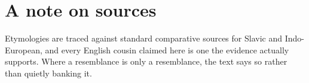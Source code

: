 
\backmatter





\chapter*{A note on sources}

Etymologies are traced against standard comparative sources for Slavic and
Indo-European, and every English cousin claimed here is one the evidence
actually supports. Where a resemblance is only a resemblance, the text says so
rather than quietly banking it.




